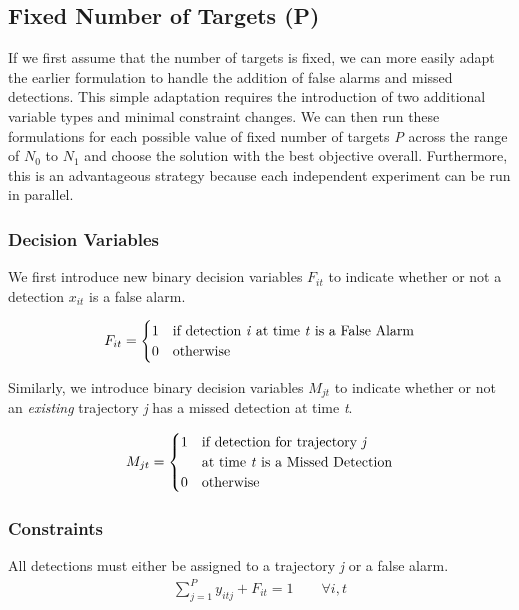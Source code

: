 \documentclass[journal]{IEEEtran}
\begin{document}
\subsection{Fixed Number of Targets (P)}
If we first assume that the number of targets is fixed, we can more easily adapt the earlier formulation to handle the addition of false alarms and missed detections. This simple adaptation requires the introduction of two additional variable types and minimal constraint changes. We can then run these formulations for each possible value of fixed number of targets \textit{P} across the range of $N_{0}$ to $N_{1}$ and choose the solution with the best objective overall. Furthermore, this is an advantageous strategy because each independent experiment can be run in parallel. 

\subsubsection{Decision Variables}

We first introduce new binary decision variables $F_{it}$ to indicate whether or not a detection $x_{it}$ is a false alarm. 

\[F_{it}= 
\begin{cases}
1 & \text{if detection \textit{i} at time \textit{t} is a False Alarm}\\
0 & \text{otherwise}
\end{cases}\]

Similarly, we introduce binary decision variables $M_{jt}$ to indicate whether or not an \textit{existing} trajectory \textit{j} has a missed detection at time \textit{t}.

\[M_{jt} =
\begin{cases}
1 & \text{if detection for trajectory \textit{j}}\\
   &\text{at time \textit{t} is a Missed Detection}\\
0 & \text{otherwise}
\end{cases}\]

\subsubsection{Constraints}

All detections must either be assigned to a trajectory \textit{j} or a false alarm. 
\begin{align}
\sum_{j=1}^{P} y_{itj} + F_{it} = 1 \qquad \forall i,t
\end{align}
\end{document}

